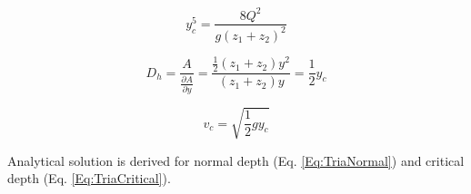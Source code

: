 \begin{equation}  
y_c^5 = \frac{8Q^2}{g(z_1 + z_2)^2}
\label{Eq:TriaCritical}
\end{equation}

\begin{equation}  
D_h = \frac{A}{\frac{\partial A}{\partial y}} = \frac{\frac{1}{2} (z_1 + z_2) y^2}{(z_1 + z_2)y} = \frac{1}{2}y_c
\end{equation}

\begin{equation}  
v_c = \sqrt{\frac{1}{2}gy_c}
\end{equation}

\noindent Analytical solution is derived for normal depth (Eq. \ref{Eq:TriaNormal}) and critical depth (Eq. \ref{Eq:TriaCritical}).